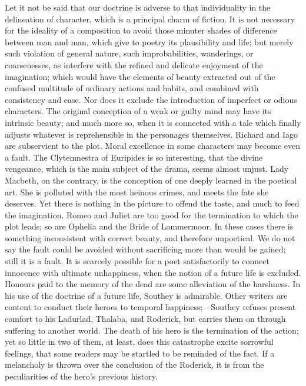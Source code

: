 Let it not be said that our doctrine is adverse to that
individuality in the delineation of character, which is a principal
charm of fiction. It is not necessary for the ideality of a
composition to avoid those minuter shades of difference between man
and man, which give to poetry its plausibility and life; but merely
such violation of general nature, such improbabilities, wanderings, or
coarsenesses, as interfere with the refined and delicate enjoyment of
the imagination; which would have the elements of beauty extracted out
of the confused multitude of ordinary actions and habits, and combined
with consistency and ease. Nor does it exclude the introduction of
imperfect or odious characters. The original conception of a weak or
guilty mind may have its intrinsic beauty; and much more so, when it
is connected with a tale which finally adjusts whatever is
reprehensible in the personages themselves. Richard and Iago are
subservient to the plot. Moral excellence in some characters may
become even a fault. The Clytemnestra of Euripides is so interesting,
that the divine vengeance, which is the main subject of the drama,
seems almost unjust. Lady Macbeth, on the contrary, is the
conception of one deeply learned in the poetical art. She is polluted
with the most heinous crimes, and meets the fate she deserves. Yet
there is nothing in the picture to offend the taste, and much to feed
the imagination. Romeo and Juliet are too good for the termination to
which the plot leads; so are Ophelia and the Bride of Lammermoor. In
these cases there is something inconsistent with correct beauty, and
therefore unpoetical. We do not say the fault could be avoided without
sacrificing more than would be gained; still it is a fault. It is
scarcely possible for a poet satisfactorily to connect innocence with
ultimate unhappiness, when the notion of a future life is excluded.
Honours paid to the memory of the dead are some alleviation of the
harshness. In his use of the doctrine of a future life, Southey is
admirable. Other writers are content to conduct their heroes to
temporal happiness;—Southey refuses present comfort to his Ladurlad,
Thalaba, and Roderick, but carries them on through suffering to
another world. The death of his hero is the termination of the action;
yet so little in two of them, at least, does this catastrophe excite
sorrowful feelings, that some readers may be startled to be reminded
of the fact. If a melancholy is thrown over the conclusion of the
Roderick, it is from the peculiarities of the hero's previous history.

